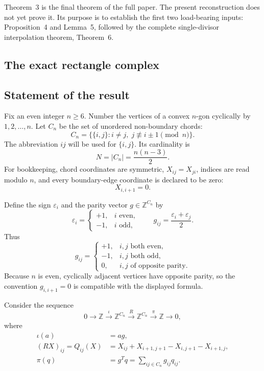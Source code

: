 \documentclass[11pt]{article}
\theoremstyle{definition}
\newcommand{\Z}{\mathbb Z}
\begin{document}
Theorem~3 is the final theorem of the full paper.  The present reconstruction does not yet prove it.  Its purpose is to establish the first two load-bearing inputs: Proposition~4 and Lemma~5, followed by the complete single-divisor interpolation theorem, Theorem~6.

\subsection{The exact rectangle complex}

\subsection{Statement of the result}

Fix an even integer $n\geq 6$.  Number the vertices of a convex $n$-gon
cyclically by $1,2,\ldots,n$.  Let $C_n$ be the set of unordered non-boundary
chords:
\[
 C_n=\bigl\{\{i,j\}:i\neq j,\;j\not\equiv i\pm1\pmod n\bigr\}.
\]
The abbreviation $ij$ will be used for $\{i,j\}$.  Its cardinality is
\[
 N=|C_n|=\frac{n(n-3)}2.
\]
For bookkeeping, chord coordinates are symmetric, $X_{ij}=X_{ji}$, indices
are read modulo $n$, and every boundary-edge coordinate is declared to be
zero:
\[
 X_{i,i+1}=0.
\]

Define the sign $\varepsilon_i$ and the parity vector $g\in\Z^{C_n}$ by
\[
 \varepsilon_i=
 \begin{cases}
 +1,&i\text{ even},\\
 -1,&i\text{ odd},
 \end{cases}
 \qquad
 g_{ij}=\frac{\varepsilon_i+\varepsilon_j}{2}.
\]
Thus
\[
 g_{ij}=
 \begin{cases}
 +1,&i,j\text{ both even},\\
 -1,&i,j\text{ both odd},\\
 0,&i,j\text{ of opposite parity}.
 \end{cases}
\]
Because $n$ is even, cyclically adjacent vertices have opposite parity, so
the convention $g_{i,i+1}=0$ is compatible with the displayed formula.

Consider the sequence
\begin{equation}\label{eq:complex}
0\longrightarrow \Z
 \xrightarrow{\;\iota\;}
 \Z^{C_n}
 \xrightarrow{\;R\;}
 \Z^{C_n}
 \xrightarrow{\;\pi\;}
 \Z\longrightarrow0,
\end{equation}
where
\begin{align}
 \iota(a)&=ag,\label{eq:iota}\\
 (RX)_{ij}=Q_{ij}(X)
 &=X_{ij}+X_{i+1,j+1}-X_{i,j+1}-X_{i+1,j},\label{eq:R}\\
 \pi(q)&=g^Tq=\sum_{ij\in C_n}g_{ij}q_{ij}.
 \label{eq:pi}
\end{align}
\end{document}
